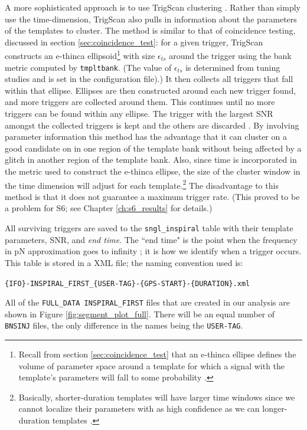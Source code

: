 A more sophisticated approach is to use TrigScan clustering
\cite{SenguptaTrigScan:2008, Keppel:thesis}. Rather than simply use the
time-dimension, TrigScan also pulls in information about the parameters of the
templates to cluster. The method is similar to that of coincidence testing,
discussed in section \ref{sec:coincidence_test}: for a given trigger, TrigScan
constructs an e-thinca ellipsoid\footnote{Recall from section
\ref{sec:coincidence_test} that an e-thinca ellipse defines the volume of
parameter space around a template for which a signal with the template's
parameters will fall to some probability \cite{Robinson:2008}.} with size
$\epsilon_{ts}$ around the trigger using the bank metric computed by
\texttt{tmpltbank}. (The value of $\epsilon_{ts}$ is determined from tuning
studies and is set in the configuration file).) It then collects all triggers
that fall within that ellipse. Ellipses are then constructed around each new
trigger found, and more triggers are collected around them. This continues
until no more triggers can be found within any ellipse. The trigger with the
largest \ac{SNR} amongst the collected triggers is kept and the others are
discarded \cite{SenguptaTrigScan:2008, Keppel:thesis}. By involving parameter
information this method has the advantage that it can cluster on a good
candidate on in one region of the template bank without being affected by a
glitch in another region of the template bank. Also, since time is incorporated
in the metric used to construct the e-thinca ellipse, the size of the cluster
window in the time dimension will adjust for each template.\footnote{Basically,
shorter-duration templates will have larger time windows since we cannot
localize their parameters with as high confidence as we can longer-duration
templates \cite{SenguptaTrigScan:2008}.} The disadvantage to this method is that it
does not guarantee a maximum trigger rate. (This proved to be a problem for
\ac{S6}; see Chapter \ref{ch:s6_results} for details.)

All surviving triggers are saved to the \texttt{sngl\_inspiral} table with
their template parameters, \ac{SNR}, and \emph{end time}. The ``end time" is
the point when the frequency in \ac{pN} approximation goes to infinity
\cite{Brown}; it is how we identify when a trigger occurs. This table is stored
in a XML file; the naming convention used is:
\begin{center}
\texttt{\{IFO\}-INSPIRAL\_FIRST\_\{USER-TAG\}-\{GPS-START\}-\{DURATION\}.xml}
\end{center}
All of the \texttt{FULL\_DATA INSPIRAL\_FIRST} files that are created in our
analysis are shown in Figure \ref{fig:segment_plot_full}. There will be an
equal number of \texttt{BNSINJ} files, the only difference in the names being
the \texttt{USER-TAG}.

